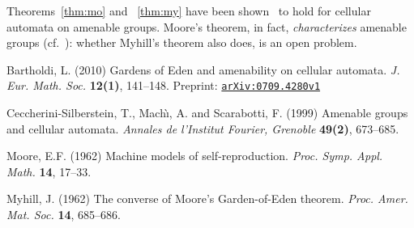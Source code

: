 \documentclass[12pt]{article}
\begin{document}
Theorems~\ref{thm:mo} and ~\ref{thm:my}
have been shown~\cite{csms99}
to hold for cellular automata on amenable groups.
Moore's theorem, in fact, \emph{characterizes} amenable groups
(cf.~\cite{b10}):
whether Myhill's theorem also does,
is an open problem.

\begin{thebibliography}{99}

Bartholdi, L. (2010)
Gardens of Eden and amenability on cellular automata.
\textit{J. Eur. Math. Soc.} \textbf{12(1)}, 141--148.
Preprint: \href{http://arxiv.org/abs/0709.4280}{\texttt{arXiv:0709.4280v1}}

Ceccherini-Silberstein, T., Mach\`{\i}, A. and Scarabotti, F. (1999)
Amenable groups and cellular automata.
\textit{Annales de l'Institut Fourier, Grenoble} \textbf{49(2)}, 673--685.

Moore, E.F. (1962)
Machine models of self-reproduction.
\textit{Proc. Symp. Appl. Math.} \textbf{14}, 17--33.

Myhill, J. (1962)
The converse of Moore's Garden-of-Eden theorem.
\textit{Proc. Amer. Mat. Soc.} \textbf{14}, 685--686.

\end{thebibliography}

\end{document}
